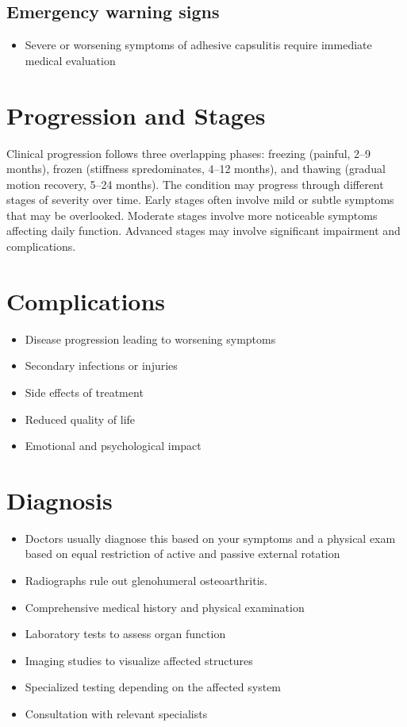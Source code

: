 \subsection{Emergency warning signs}
\begin{itemize}[noitemsep]
  \item Severe or worsening symptoms of adhesive capsulitis require immediate medical evaluation
\end{itemize}
\section{Progression and Stages}
Clinical progression follows three overlapping phases: freezing (painful, 2--9 months), frozen (stiffness spredominates, 4--12 months), and thawing (gradual motion recovery, 5--24 months). The condition may progress through different stages of severity over time. Early stages often involve mild or subtle symptoms that may be overlooked. Moderate stages involve more noticeable symptoms affecting daily function. Advanced stages may involve significant impairment and complications.
\section{Complications}
\begin{itemize}[noitemsep]
  \item Disease progression leading to worsening symptoms
  \item Secondary infections or injuries
  \item Side effects of treatment
  \item Reduced quality of life
  \item Emotional and psychological impact
\end{itemize}
\section{Diagnosis}
\begin{itemize}[noitemsep]
  \item Doctors usually diagnose this based on your symptoms and a physical exam based on equal restriction of active and passive external rotation
  \item Radiographs rule out glenohumeral osteoarthritis.
  \item Comprehensive medical history and physical examination
  \item Laboratory tests to assess organ function
  \item Imaging studies to visualize affected structures
  \item Specialized testing depending on the affected system
  \item Consultation with relevant specialists
\end{itemize}
